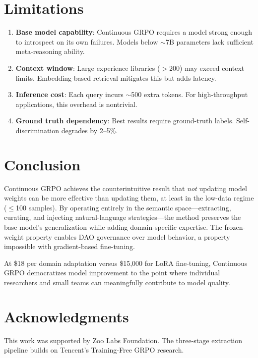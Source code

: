 \documentclass[11pt,letterpaper]{article}
\begin{document}
\section{Limitations}

\begin{enumerate}
    \item \textbf{Base model capability}: Continuous GRPO requires a model strong enough to introspect on its own failures.  Models below $\sim$7B parameters lack sufficient meta-reasoning ability.
    \item \textbf{Context window}: Large experience libraries ($>$200) may exceed context limits.  Embedding-based retrieval mitigates this but adds latency.
    \item \textbf{Inference cost}: Each query incurs $\sim$500 extra tokens.  For high-throughput applications, this overhead is nontrivial.
    \item \textbf{Ground truth dependency}: Best results require ground-truth labels.  Self-discrimination degrades by 2--5\%.
\end{enumerate}

\section{Conclusion}

Continuous GRPO achieves the counterintuitive result that \textit{not} updating model weights can be more effective than updating them, at least in the low-data regime ($\leq$100 samples).  By operating entirely in the semantic space---extracting, curating, and injecting natural-language strategies---the method preserves the base model's generalization while adding domain-specific expertise.  The frozen-weight property enables DAO governance over model behavior, a property impossible with gradient-based fine-tuning.

At \$18 per domain adaptation versus \$15{,}000 for LoRA fine-tuning, Continuous GRPO democratizes model improvement to the point where individual researchers and small teams can meaningfully contribute to model quality.

\section*{Acknowledgments}

This work was supported by Zoo Labs Foundation.  The three-stage extraction pipeline builds on Tencent's Training-Free GRPO research.
\end{document}
